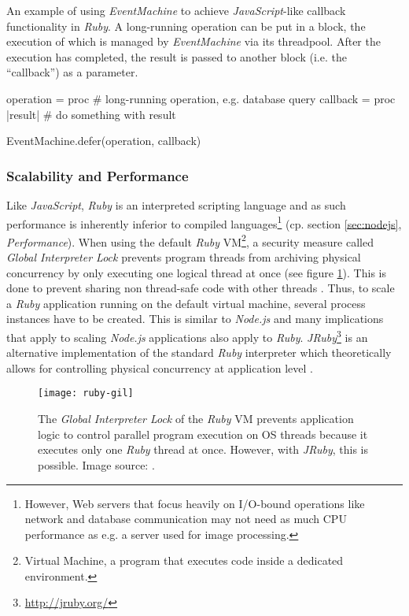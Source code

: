 \begin{program}
  \caption{An example of using \textit{EventMachine} to achieve \textit{JavaScript}-like callback functionality in \textit{Ruby}. A long-running operation can be put in a block, the execution of which is managed by \textit{EventMachine} via its threadpool. After the execution has completed, the result is passed to another block (i.e. the ``callback'') as a parameter.}
  \label{prog:ruby-defer}
  \begin{JavaCode}
operation = proc {
    # long-running operation, e.g. database query
}
callback = proc { |result|
    # do something with result
}

EventMachine.defer(operation, callback)
  \end{JavaCode}
\end{program}

\subsubsection*{Scalability and Performance}
Like \textit{JavaScript}, \textit{Ruby} is an interpreted scripting language and as such performance is inherently inferior to compiled languages\footnote{However, Web servers that focus heavily on I/O-bound operations like network and database communication may not need as much CPU performance as e.g. a server used for image processing.} (cp. section \ref{sec:nodejs}, \textit{Performance}). When using the default \textit{Ruby} VM\footnote{Virtual Machine, a program that executes code inside a dedicated environment.}, a security measure called \textit{Global Interpreter Lock} prevents program threads from archiving physical concurrency by only executing one logical thread at once (see figure \ref{fig:gil}). This is done to prevent sharing non thread-safe code with other threads \cite{ruby-gil}. Thus, to scale a \textit{Ruby} application running on the default virtual machine, several process instances have to be created. This is similar to \textit{Node.js} and many implications that apply to scaling \textit{Node.js} applications also apply to \textit{Ruby}. \textit{JRuby}\footnote{\url{http://jruby.org/}} is an alternative implementation of the standard \textit{Ruby} interpreter which theoretically allows for controlling physical concurrency at application level \cite{ruby-gil}.

\begin{figure}
\centering\small
\setlength{\tabcolsep}{0mm}
  \texttt{[image: ruby-gil]}
\caption{
The \textit{Global Interpreter Lock} of the \textit{Ruby} VM prevents application logic to control parallel program execution on OS threads because it executes only one \textit{Ruby} thread at once. However, with \textit{JRuby}, this is possible. Image source: \cite{ruby-gil}.}
\label{fig:gil}
\end{figure}

